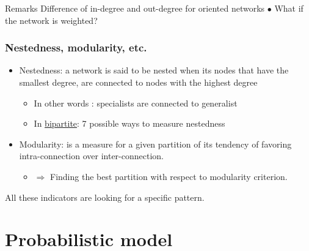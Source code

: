 \documentclass[compress,10pt]{beamer}
\begin{document}
\begin{frame}
\alert{Remarks} 
 Difference of in-degree and out-degree for oriented networks \textcolor{dgreen}{$\bullet$} What if the network is weighted? 



\end{frame}





\begin{frame}\frametitle{Nestedness, modularity, etc.}

\begin{itemize}
 \item \alert{Nestedness}: a network is said to be nested when its nodes that have the smallest degree, are connected to nodes with the highest degree \textcolor{mygreen}{\cite{Rodriguez2006}}


\begin{itemize}
\item In other words : specialists are connected to generalist
\item In \href{https://cran.r-project.org/web/packages/bipartite/index.html}{bipartite}: 7 possible ways to measure nestedness
\end{itemize}




\item  \alert{Modularity}: is a measure for a given partition of its tendency of favoring intra-connection over inter-connection.  
\begin{itemize}
\item $\Rightarrow$ Finding the best partition with respect to modularity criterion. 
\textcolor{mygreen}{\cite{clauset2008hierarchical}}
\end{itemize}

\end{itemize}

\bigskip
\centering

All these indicators are \alert{looking for a specific pattern.}
\end{frame}

\section{Probabilistic  model}
\end{document}
